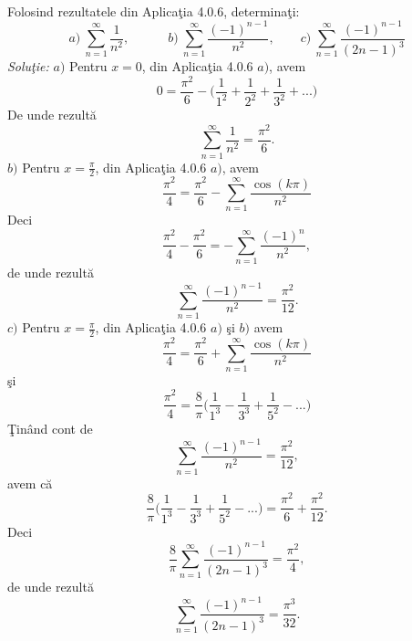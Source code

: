 \documentclass[a4paper,openany,12pt]{report}
\begin{document}
\paragraph*{} Folosind rezultatele din Aplica\c tia 4.0.6, determina\c ti:
\begin{equation*}
a)\:\sum_{n=1}^{\infty}\frac{1}{n^2},\quad\quad\quad b)\:\sum_{n=1}^{\infty}\frac{(-1)^{n-1}}{n^2},\quad\quad c)\:\sum_{n=1}^{\infty}\frac{(-1)^{n-1}}{(2n-1)^3}
\end{equation*}
\textit{Solu\c tie:}
\newline
$a)$ Pentru $x=0$, din Aplica\c tia 4.0.6 $a)$, avem
\begin{equation*}
0= \frac{\pi^2}{6}-\bigg(\frac{1}{1^2}+\frac{1}{2^2}+\frac{1}{3^2}+...\bigg)
\end{equation*}
De unde rezult\u a
\begin{equation*}
\sum_{n=1}^{\infty}\frac{1}{n^2}=\frac{\pi^2}{6}.
\end{equation*}
\newline
\newline
$b)$ Pentru $x=\frac{\pi}{2}$, din Aplica\c tia 4.0.6 $a)$, avem
\begin{equation*}
\frac{\pi^2}{4}=\frac{\pi^2}{6}-\sum_{n=1}^{\infty}\frac{\cos(k\pi)}{n^2}
\end{equation*}
Deci
\begin{equation*}
\frac{\pi^2}{4}-\frac{\pi^2}{6}=-\sum_{n=1}^{\infty}\frac{(-1)^n}{n^2},
\end{equation*}
de unde rezult\u a
\begin{equation*}
\sum_{n=1}^{\infty}\frac{(-1)^{n-1}}{n^2}=\frac{\pi^2}{12}.
\end{equation*}
\newline
\newline
$c)$ Pentru $x=\frac{\pi}{2}$, din Aplica\c tia 4.0.6 $a)$ \c si $b)$ avem
\begin{equation*}
\frac{\pi^2}{4}=\frac{\pi^2}{6}+\sum_{n=1}^{\infty}\frac{\cos(k\pi)}{n^2}
\end{equation*}
\c si
\begin{equation*}
\frac{\pi^2}{4}=\frac{8}{\pi}\bigg(\frac{1}{1^3}-\frac{1}{3^3}+\frac{1}{5^2}-...\bigg)
\end{equation*}
\c Tin\^ and cont de 
\begin{equation*}
\sum_{n=1}^{\infty}\frac{(-1)^{n-1}}{n^2}=\frac{\pi^2}{12},
\end{equation*}
avem c\u a
\begin{equation*}
\frac{8}{\pi}\bigg(\frac{1}{1^3}-\frac{1}{3^3}+\frac{1}{5^2}-...\bigg)=\frac{\pi^2}{6}+\frac{\pi^2}{12}.
\end{equation*}
Deci
\begin{equation*}
\frac{8}{\pi}\sum_{n=1}^{\infty}\frac{(-1)^{n-1}}{(2n-1)^3}=\frac{\pi^2}{4},
\end{equation*}
de unde rezult\u a
\begin{equation*}
\sum_{n=1}^{\infty}\frac{(-1)^{n-1}}{(2n-1)^3}=\frac{\pi^3}{32}.
\end{equation*}
\end{document}
